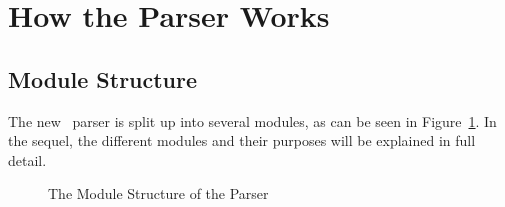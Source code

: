 \section{How the Parser Works}

\subsection{Module Structure}

The new \redux\ parser is split up into several modules, as can be seen
in Figure~\ref{modules}. 
In the sequel, the different modules and
their purposes will be explained in full detail.

\begin{figure}[htbp]
\begin{center}
\vspace{1cm}
\caption{The Module Structure of the Parser}
\label{modules}
\end{center}
\end{figure}

